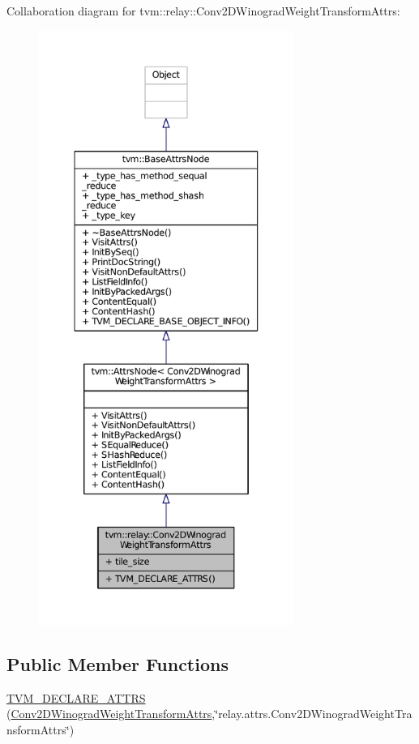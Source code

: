Collaboration diagram for tvm\+:\+:relay\+:\+:Conv2\+D\+Winograd\+Weight\+Transform\+Attrs\+:
\nopagebreak
\begin{figure}[H]
\begin{center}
\leavevmode
\includegraphics[height=550pt]{structtvm_1_1relay_1_1Conv2DWinogradWeightTransformAttrs__coll__graph}
\end{center}
\end{figure}
\subsection*{Public Member Functions}
\begin{DoxyCompactItemize}
\item 
\hyperlink{structtvm_1_1relay_1_1Conv2DWinogradWeightTransformAttrs_a613840b8fdc7fdb4e82e5c63559e960a}{T\+V\+M\+\_\+\+D\+E\+C\+L\+A\+R\+E\+\_\+\+A\+T\+T\+RS} (\hyperlink{structtvm_1_1relay_1_1Conv2DWinogradWeightTransformAttrs}{Conv2\+D\+Winograd\+Weight\+Transform\+Attrs},\char`\"{}relay.\+attrs.\+Conv2\+D\+Winograd\+Weight\+Transform\+Attrs\char`\"{})
\end{DoxyCompactItemize}
